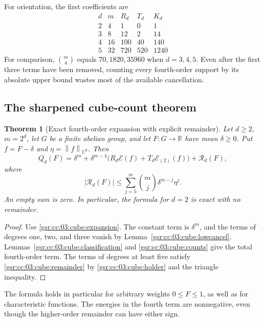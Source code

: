 \documentclass[11pt,letterpaper]{article}
\numberwithin{equation}{section}
\newtheorem{theorem}{Theorem}[section]
\theoremstyle{definition}
\theoremstyle{remark}
\newcommand{\R}{\mathbb R}
\newcommand{\1}{\mathbf 1}
\newcommand{\norm}[1]{\left\|#1\right\|}
\begin{document}
For orientation, the first coefficients are
\[
\begin{array}{c|r|r|r|r}
 d&m&R_d&T_d&K_d\\\hline
 2&4&1&0&1\\
 3&8&12&2&14\\
 4&16&100&40&140\\
 5&32&720&520&1240
\end{array}
\]
For comparison, $\binom m4$ equals $70,1820,35960$ when
$d=3,4,5$.  Even after the first three terms have been removed, counting
every fourth-order support by its absolute upper bound wastes most of
the available cancellation.

\subsection{The sharpened cube-count theorem}

\begin{theorem}[Exact fourth-order expansion with explicit remainder]
\label{gsr:cc:03:cube:main}
Let $d\geq2$, $m=2^d$, let $G$ be a finite abelian group, and let
$F:G\to\R$ have mean $\delta\geq0$.  Put
$f=F-\delta$ and $\eta=\norm f_{U^d}$.  Then
\begin{equation}
 Q_d(F)=\delta^m+
 \delta^{m-4}\bigl(R_d\mathcal E(f)+T_d\mathcal E_{(2)}(f)\bigr)
 +\mathcal R_d(F),
 \label{gsr:cc:03:cube:mainformula}
\end{equation}
where
\begin{equation}
 |\mathcal R_d(F)|
 \leq\sum_{j=5}^{m}\binom mj\delta^{m-j}\eta^j.
 \label{gsr:cc:03:cube:remainder}
\end{equation}
An empty sum is zero.  In particular, the formula for $d=2$ is exact
with no remainder.
\end{theorem}

\begin{proof}
Use \eqref{gsr:cc:03:cube:expansion}.  The constant term is $\delta^m$, and the
terms of degrees one, two, and three vanish by
Lemma~\ref{gsr:cc:03:cube:lowcancel}.  Lemmas~\ref{gsr:cc:03:cube:classification} and
\ref{gsr:cc:03:cube:counts} give the total fourth-order term.  The terms of
degrees at least five satisfy \eqref{gsr:cc:03:cube:remainder} by
\eqref{gsr:cc:03:cube:holder} and the triangle inequality.
\end{proof}

The formula holds in particular for arbitrary weights $0\leq F\leq1$,
as well as for characteristic functions.  The energies in the fourth
term are nonnegative, even though the higher-order remainder can have
either sign.
\end{document}
